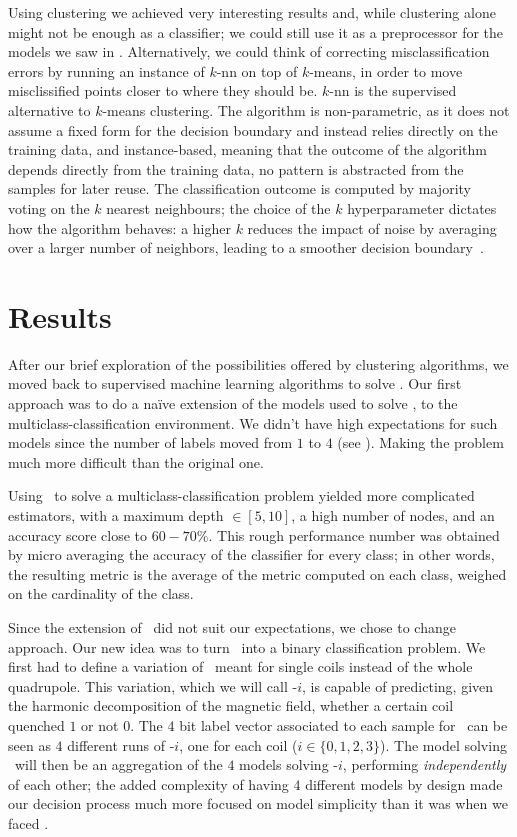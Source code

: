 Using clustering we achieved very interesting results and, while clustering alone might not be
enough as a classifier; we could still use it as a preprocessor for the models we saw in
. Alternatively, we could think of correcting misclassification errors by running an
instance of $k$-nn on top of $k$-means, in order to move misclissified points closer to where they
should be.
$k$-nn is the supervised alternative to $k$-means clustering. The algorithm is
non-parametric, as it does not assume a fixed form for the decision boundary and instead
relies directly on the training data, and instance-based, meaning that the outcome of the
algorithm depends directly from the training data, no pattern is abstracted from the samples
for later reuse. The classification outcome is computed by majority voting on the $k$ nearest
neighbours; the choice of the $k$ hyperparameter dictates how the algorithm behaves: a higher $k$
reduces the impact of noise by averaging over a larger number of neighbors, leading to a smoother
decision boundary~\cite{syriopoulos2025-knn}.

\section{Results}
After our brief exploration of the possibilities offered by clustering algorithms, we moved back to
supervised machine learning algorithms to solve \qlp. Our first approach was to do a na\"ive
extension of the models used to solve \qrp, to the multiclass-classification environment. We didn't
have high expectations for such models since the number of labels moved from $1$ to $4$ (see
). Making the problem much more difficult than the original one.

\medskip

Using \dts\ to solve a multiclass-classification problem yielded more complicated estimators, with a
maximum depth $\in [5, 10]$, a high number of nodes, and an accuracy score close to $60 - 70\%$. This rough performance
number was obtained by micro averaging the accuracy of the classifier for every class; in other
words, the resulting metric is the average of the metric computed on each class, weighed on the cardinality of the class.

\medskip

Since the extension of \dts\ did not suit our expectations, we chose to change approach. Our new
idea was to turn \qlp\ into a binary classification problem. We first had to define a variation of
\qrp\ meant for single coils instead of the whole quadrupole. This variation, which we will call
\qrp-$i$, is capable of predicting, given the harmonic decomposition of the magnetic field, whether
a certain coil quenched $1$ or not $0$. The $4$ bit label vector associated to each sample for \qlp\
can be seen as $4$ different runs of \qrp-$i$, one for each coil ($i \in \{0, 1, 2, 3\}$). The model
solving \qlp\ will then be an aggregation of the $4$ models solving \qrp-$i$, performing
\emph{independently} of each other; the added complexity of having $4$ different models by design
made our decision process much more focused on model simplicity than it was when we faced \qrp.

